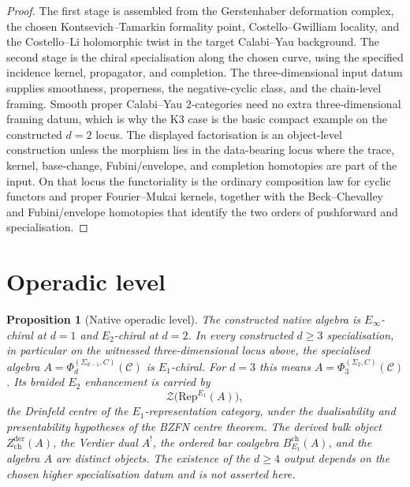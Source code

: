\documentclass[11pt]{amsart}
\providecommand{\cC}{\mathcal{C}}
\providecommand{\cZ}{\mathcal{Z}}
\providecommand{\Rep}{\mathrm{Rep}}
\newtheorem{proposition}[theorem]{Proposition}
\theoremstyle{definition}
\theoremstyle{remark}
\begin{document}
\begin{proof}
The first stage is assembled from the Gerstenhaber deformation complex, the
chosen Kontsevich--Tamarkin formality point, Costello--Gwilliam locality,
and the Costello--Li holomorphic twist in the target Calabi--Yau
background. The second stage is the chiral
specialisation along the chosen curve, using the specified incidence
kernel, propagator, and completion. The three-dimensional input datum
supplies smoothness, properness, the negative-cyclic class, and the
chain-level framing. Smooth proper Calabi--Yau \(2\)-categories need no
extra three-dimensional framing datum, which is why the K3 case is the
basic compact example on the constructed \(d=2\) locus. The displayed
factorisation is an object-level construction unless the morphism lies in
the data-bearing locus where the
trace, kernel, base-change, Fubini/envelope, and completion homotopies are
part of the input. On that locus the functoriality is the ordinary
composition law for cyclic functors and proper Fourier--Mukai kernels,
together with the Beck--Chevalley and Fubini/envelope homotopies that
identify the two orders of pushforward and specialisation.
\end{proof}

\section{Operadic level}

\begin{proposition}[Native operadic level]
The constructed native algebra is \(E_\infty\)-chiral at \(d=1\) and
\(E_2\)-chiral at \(d=2\). In every constructed \(d\geq3\)
specialisation, in particular on the witnessed three-dimensional locus
above, the specialised algebra
\(A=\Phi_d^{(\Sigma_{d-1},C)}(\cC)\) is \(E_1\)-chiral. For \(d=3\) this
means \(A=\Phi_3^{(\Sigma_2,C)}(\cC)\). Its braided \(E_2\) enhancement is
carried by
\[
        \cZ\bigl(\Rep^{E_1}(A)\bigr),
\]
the Drinfeld centre of the \(E_1\)-representation category, under the
dualisability and presentability hypotheses of the BZFN centre theorem.
The derived bulk object \(Z^{\mathrm{der}}_{\mathrm{ch}}(A)\), the Verdier
dual \(A^!\), the ordered bar coalgebra \(B^{\mathrm{ch}}_{E_1}(A)\), and
the algebra \(A\) are distinct objects. The existence of the \(d\geq4\)
output depends on the chosen higher specialisation datum and is not asserted
here.
\end{proposition}
\end{document}

